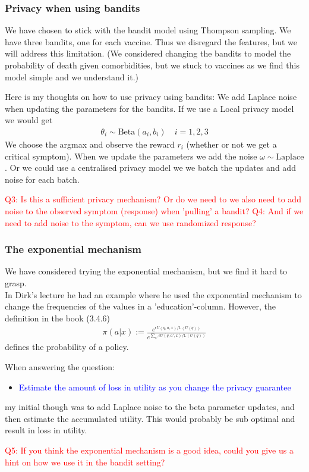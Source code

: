 \documentclass[a4paper, 12pt]{extarticle}
\begin{document}
\subsubsection*{Privacy when using bandits}
We have chosen to stick with the bandit model using Thompson sampling. 
We have three bandits, one for each vaccine.
Thus we disregard the features, but we will address this limitation. (We considered changing the bandits to model the probability of death given comorbidities, but we stuck to vaccines as we find this model simple and we understand it.)

Here is my thoughts on how to use privacy using bandits: We add Laplace noise when updating the parameters for the bandits. 
If we use a Local privacy model we would get
\begin{align*}
    \theta_i \sim \text{Beta}(a_i, b_i) \quad i=1,2, 3
\end{align*}
We choose the argmax and observe the reward $r_i$ (whether or not we get a critical symptom). When we update the parameters we add the noise $\omega \sim \text{Laplace}$. Or we could use a centralised privacy model we we batch the updates and add noise for each batch. 

\noindent \textcolor{red}{Q3: Is this a sufficient privacy mechanism? Or do we need to we also need to add noise to the observed symptom (response) when 'pulling' a bandit?}
\noindent \textcolor{red}{Q4: And if we need to add noise to the symptom, can we use randomized response?}

\subsubsection*{The exponential mechanism}
We have considered trying the exponential mechanism, but we find it hard to grasp. 
\\
In Dirk's lecture he had an example where he used the exponential mechanism to change the frequencies of the values in a 'education'-column. 
However, the definition in the book (3.4.6)
\begin{align*}
    \pi(a|x) := \frac{e^{\epsilon U(q,a,x) / \mathbb{L}(U(q))}}{e^{\sum_{a'}\epsilon U(q,a',x) / \mathbb{L}(U(q))}}
\end{align*}
defines the probability of a policy.

When answering the question: 
\begin{itemize}
    \item \textcolor{blue}{Estimate the amount of loss in utility as you change the privacy guarantee}
\end{itemize}
my initial though was to add Laplace noise to the beta parameter updates, and then estimate the accumulated utility. This would probably be sub optimal and result in loss in utility.

\noindent \textcolor{red}{Q5: If you think the exponential mechanism is a good idea, could you give us a hint on how we use it in the bandit setting?}
\end{document}
